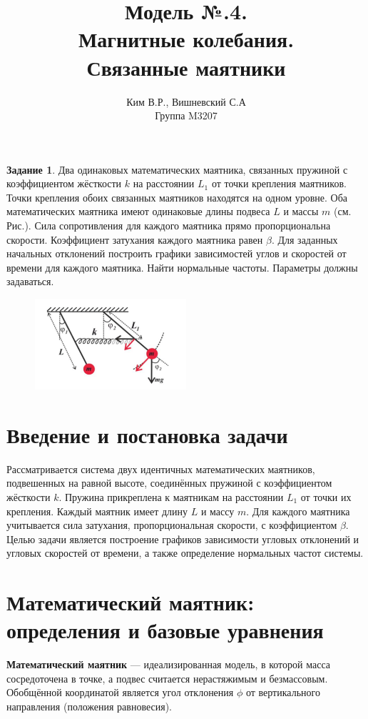 \documentclass[a4paper,11pt]{article}
\title{Модель №.4. \\ Магнитные колебания. \\ Связанные маятники }
\author{Ким В.Р., Вишневский С.А \\ Группа M3207 }
\date{}
\theoremstyle{definition}
\newtheorem*{task}{Задание}\setlength{\parindent}{0pt}
\begin{document}
\maketitle

\begin{task}
    Два одинаковых математических маятника, связанных пружиной с коэффициентом 
    жёсткости \(k\) на расстоянии \(L_1\) от точки крепления маятников. 
    Точки крепления обоих связанных маятников находятся на одном уровне. 
    Оба математических маятника имеют одинаковые длины подвеса \(L\) и массы \(m\) 
    (см. Рис.). 
    Сила сопротивления для каждого маятника прямо пропорциональна скорости. 
    Коэффициент затухания каждого маятника равен \(\beta\). Для заданных начальных 
    отклонений построить графики зависимостей углов и скоростей от времени 
    для каждого маятника. Найти нормальные частоты. 
    Параметры должны задаваться.

    \begin{figure}[H]
        \centering
        \includegraphics[width=0.5\textwidth]{4. Connected pendulum/task}\label{fig:figure}
    \end{figure}

\end{task}


\section*{Введение и постановка задачи}
Рассматривается система двух идентичных математических маятников, подвешенных на равной высоте, соединённых 
пружиной с коэффициентом жёсткости \( k \). Пружина прикреплена к маятникам на расстоянии \( L_1 \) от точки 
их крепления. Каждый маятник имеет длину \( L \) и массу \( m \). Для каждого маятника учитывается сила 
затухания, пропорциональная скорости, с коэффициентом \(\beta\). Целью задачи является построение графиков 
зависимости угловых отклонений и угловых скоростей от времени, а также определение нормальных частот системы.



\section*{Математический маятник: определения и базовые уравнения}
\textbf{Математический маятник} --- идеализированная модель, в которой масса сосредоточена в точке, а подвес 
считается нерастяжимым и безмассовым. Обобщённой координатой является угол отклонения \(\phi\) от вертикального 
направления (положения равновесия).
\end{document}
